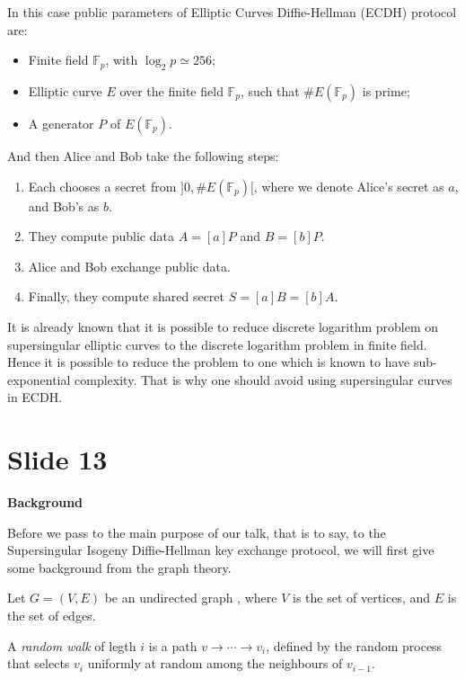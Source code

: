 \documentclass[10 pt]{article}
\begin{document}
{In this case public parameters of Elliptic Curves Diffie-Hellman (ECDH) protocol are:

\begin{itemize}
	\item Finite field $\mathbb{F}_p$, with $\log_2p \simeq 256$;
	
	\item Elliptic curve $E$ over the finite field $\mathbb{F}_p$, such that $\#E(\mathbb{F}_p)$ is prime;
	
	\item A generator $P$ of $E(\mathbb{F}_p)$.
\end{itemize} 

And then Alice and Bob take the following steps:

\begin{enumerate}
	\item Each chooses a secret from $]0, \#E(\mathbb{F}_p)[$, where we denote Alice's secret as $a$, and Bob's as $b$.
	
	\item They compute public data $A = [a]P$ and $B = [b]P$.
	
	\item Alice and Bob exchange public data.
	
	\item Finally, they compute shared secret $S = [a]B = [b]A$.
\end{enumerate}

It is already known that it is possible to reduce discrete logarithm problem on supersingular elliptic curves to the discrete logarithm problem in finite field. Hence it is possible to reduce the problem to one which is known to have sub-exponential complexity. That is why one should avoid using supersingular curves in ECDH.

\section{Slide 13} \large{\textbf{Background}}

Before we pass to the main purpose of our talk, that is to say, to the Supersingular Isogeny Diffie-Hellman key exchange protocol, we will first give some background from the graph theory.

Let $G = (V, E)$ be an undirected graph , where $V$ is the set of vertices, and $E$ is the set of edges. 

A \emph{random walk} of legth $i$ is a path $v \to \cdots \to v_i$, defined by the random process that selects $v_i$ uniformly at random among the neighbours of $v_{i-1}$.

}
\end{document}
